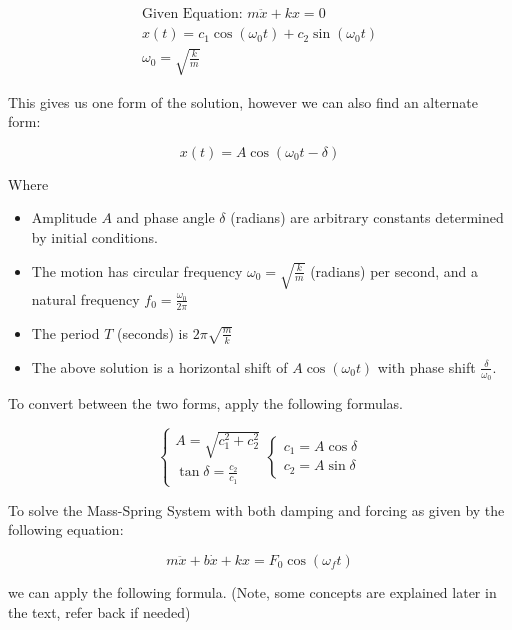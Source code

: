             \[ \begin{aligned}
                \text{Given Equation: } m \ddot{x} + kx = 0\\
                x(t) = c_1 \cos \left( \omega_0 t \right) + c_2 \sin \left( \omega_0 t \right)\\
                \omega_0 = \sqrt{\frac{k}{m}}
            \end{aligned} \]

        This gives us one form of the solution, however we can also find an alternate form:

            \[ x(t) = A \cos \left( \omega_0 t - \delta \right) \]

        Where
            \begin{itemize}
                \item Amplitude $A$ and phase angle $\delta$ (radians) are arbitrary constants determined by initial conditions.
                \item The motion has circular frequency $\omega_0 = \sqrt{\frac{k}{m}}$ (radians) per second, and a natural frequency $f_0 = \frac{\omega_0}{2 \pi}$
                \item The period $T$ (seconds) is $2 \pi \sqrt{\frac{m}{k}}$
                \item The above solution is a horizontal shift of $A \cos (\omega_0 t)$ with phase shift $\frac{\delta}{\omega_0}$.
            \end{itemize}

        To convert between the two forms, apply the following formulas.

            \[
                \begin{cases}
                    A = \sqrt{c_1^2 + c_2^2}\\
                    \tan \delta = \frac{c_2}{c_1}
                \end{cases}
                \begin{cases}
                    c_1 = A \cos \delta\\
                    c_2 = A \sin \delta
                \end{cases}
            \]

        To solve the Mass-Spring System with both damping and forcing as given by the following equation:

            \[
                m \ddot{x} + b\dot{x} + kx = F_0 \cos ( \omega_f t )
            \]

        we can apply the following formula. (Note, some concepts are explained later in the text, refer back if needed)


